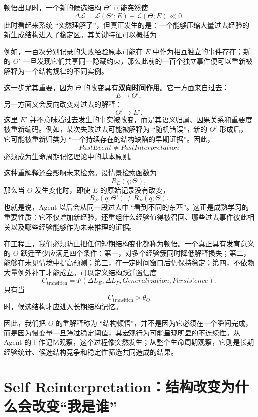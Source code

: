 顿悟出现时，一个新的候选结构 $\Theta'$ 可能突然使
\[
\Delta\mathcal L
=
\mathcal L(\Theta';E)
-
\mathcal L(\Theta;E)
\ll 0.
\]
此时看起来系统 ``突然理解了''，但真正发生的是：一个能够压缩大量过去经验的新生成结构进入了稳定区。其关键特征可以概括为
\begin{statementbox}
\centering
{}
\end{statementbox}
例如，一百次分别记录的失败经验原本可能在 $E$ 中作为相互独立的事件存在；新的 $\Theta'$ 一旦发现它们共享同一隐藏约束，那么此前的一百个独立事件便可以重新被解释为一个结构规律的不同实例。

这一步尤其重要，因为 $\Theta$ 的改变具有\textbf{双向时间作用}。它一方面来自过去：
\[
E\rightarrow\Theta',
\]
另一方面又会反向改变对过去的解释：
\[
\Theta'\rightarrow E'.
\]
这里 $E'$ 并不意味着过去发生的事实被改变，而是其语义归属、因果关系和重要度被重新编码。例如，某次失败过去可能被解释为 ``随机错误''，新的 $\Theta'$ 形成后，它可能被重新归类为 ``一个持续存在的结构缺陷的早期证据''。因此，
\[
\boxed{
PastEvent\neq PastInterpretation
}
\]
必须成为生命周期记忆理论中的基本原则。

这种重解释还会影响未来检索。设情景检索函数为
\[
R_E(q;\Theta),
\]
那么当 $\Theta$ 发生变化时，即使 $E$ 的原始记录没有改变，
\[
R_E(q;\Theta')
\neq
R_E(q;\Theta).
\]
也就是说，Agent 以后会从同一段过去中 ``看到不同的东西''。这正是成熟学习的重要性质：它不仅增加新经验，还重组什么经验值得被召回、哪些过去事件彼此相关以及哪些经验能够作为未来推理的证据。

在工程上，我们必须防止把任何短期结构变化都称为顿悟。一个真正具有发育意义的 $\Theta$ 跃迁至少应满足四个条件：第一，对多个经验簇同时降低解释损失；第二，能够在未见情境中提高预测；第三，在一定时间窗口后仍保持稳定；第四，不依赖大量例外补丁才能成立。可以定义结构跃迁置信度
\[
C_{\mathrm{transition}}
=
F(
\Delta L_E,
\Delta L_P,
Generalization,
Persistence
).
\]
只有当
\[
C_{\mathrm{transition}}>\theta_{\Theta}
\]
时，候选结构才应进入长期结构记忆。

因此，我们把 $\Theta$ 的重解释称为 ``结构顿悟''，并不是因为它必须在一个瞬间完成，而是因为慢变量一旦跨过稳定阈值，其宏观行为可能呈现明显的不连续性。从 Agent 的工作记忆观察，这个过程像突然发生；从整个生命周期观察，它则是长期经验统计、候选结构竞争和稳定性筛选共同造成的结果。

\section{Self Reinterpretation：结构改变为什么会改变“我是谁”}

